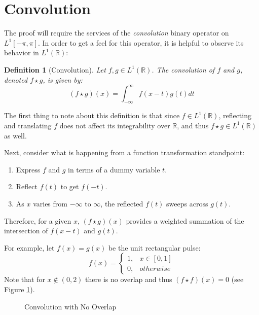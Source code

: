 \documentclass[letterpaper,12pt,fleqn,reqno]{amsart}
\theoremstyle{plain}
\newtheorem{definition}[theorem]{Definition}
\newcommand{\R}{\mathbb{R}}
\newcommand{\Lop}{L^1[-\pi,\pi]}
\newcommand{\Lor}{L^1(\R)}
\begin{document}
\section{Convolution}

The proof will require the services of the \emph{convolution} binary operator
on $\Lop$. In order to get a feel for this operator, it is helpful to observe
its behavior in $\Lor$:
\begin{definition}[Convolution]
  Let $f,g\in\Lor$. The convolution of $f$ and $g$, denoted $f\star g$, is
  given by:
  \[(f\star g)(x)=\int_{-\infty}^{\infty}f(x-t)g(t)dt\]
\end{definition}
The first thing to note about this definition is that since $f\in\Lor$,
reflecting and translating $f$ does not affect its integrability over $\R$,
and thus $f\star g\in\Lor$ as well.

Next, consider what is happening from a function transformation standpoint:
\begin{enumerate}
\item Express $f$ and $g$ in terms of a dummy variable $t$.
\item Reflect $f(t)$ to get $f(-t)$.
\item As $x$ varies from $-\infty$ to $\infty$, the reflected $f(t)$ sweeps
  across $g(t)$.
\end{enumerate}
Therefore, for a given $x$, $(f\star g)(x)$ provides a weighted summation of
the intersection of $f(x-t)$ and $g(t)$.

For example, let $f(x)=g(x)$ be the unit rectangular pulse:
\[f(x)=\begin{cases}
1, & x\in[0,1] \\
0, & otherwise
\end{cases}\]
Note that for $x\notin(0,2)$ there is no overlap and thus $(f\star f)(x)=0$
(see Figure \ref{fig:conv:noover}).

\begin{figure}[ht]
  \caption{Convolution with No Overlap}
  \label{fig:conv:noover}
\end{figure}
\end{document}
